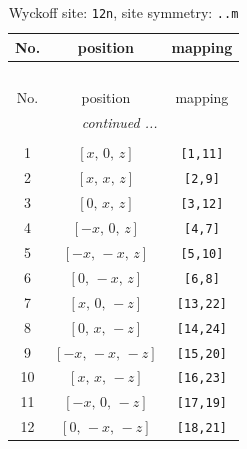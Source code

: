\documentclass[fleqn,8pt]{jsarticle}
\begin{document}
\begin{longtable}{ccc}
\caption{Wyckoff site: {\tt 12n}, site symmetry: {\tt ..m}}
 \\
 \hline \hline
No. & position & mapping \\ \hline \endfirsthead

\multicolumn{2}{l}{\tablename\ \thetable{}} \\
 \hline \hline
No. & position & mapping \\ \hline \endhead

 \hline \hline
\multicolumn{2}{r}{\footnotesize\it continued ...} \\ \endfoot

 \hline \hline
\multicolumn{2}{r}{} \\ \endlastfoot

1 & $\left[ x,\, 0,\, z \right]$ & {\tt [1,11]} \\ \hline
2 & $\left[ x,\, x,\, z \right]$ & {\tt [2,9]} \\ \hline
3 & $\left[ 0,\, x,\, z \right]$ & {\tt [3,12]} \\ \hline
4 & $\left[ - x,\, 0,\, z \right]$ & {\tt [4,7]} \\ \hline
5 & $\left[ - x,\, - x,\, z \right]$ & {\tt [5,10]} \\ \hline
6 & $\left[ 0,\, - x,\, z \right]$ & {\tt [6,8]} \\ \hline
7 & $\left[ x,\, 0,\, - z \right]$ & {\tt [13,22]} \\ \hline
8 & $\left[ 0,\, x,\, - z \right]$ & {\tt [14,24]} \\ \hline
9 & $\left[ - x,\, - x,\, - z \right]$ & {\tt [15,20]} \\ \hline
10 & $\left[ x,\, x,\, - z \right]$ & {\tt [16,23]} \\ \hline
11 & $\left[ - x,\, 0,\, - z \right]$ & {\tt [17,19]} \\ \hline
12 & $\left[ 0,\, - x,\, - z \right]$ & {\tt [18,21]} \\
\end{longtable}
\renewcommand{\arraystretch}{1.2}
\end{document}
